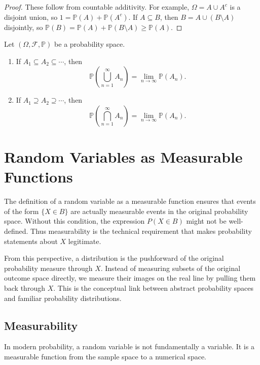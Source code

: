 \begin{proof}
These follow from countable additivity. For example, $\Omega=A\cup A^c$ is a disjoint union, so $1=\mathbb{P}(A)+\mathbb{P}(A^c)$. If $A\subseteq B$, then $B=A\cup(B\setminus A)$ disjointly, so $\mathbb{P}(B)=\mathbb{P}(A)+\mathbb{P}(B\setminus A)\geq\mathbb{P}(A)$.
\end{proof}

\newpage

\begin{proposition}
Let $(\Omega,\mathcal{F},\mathbb{P})$ be a probability space.
\begin{enumerate}
    \item If $A_1\subseteq A_2\subseteq\cdots$, then
    \[
        \mathbb{P}\left(\bigcup_{n=1}^{\infty}A_n\right)=\lim_{n\to\infty}\mathbb{P}(A_n).
    \]
    \item If $A_1\supseteq A_2\supseteq\cdots$, then
    \[
        \mathbb{P}\left(\bigcap_{n=1}^{\infty}A_n\right)=\lim_{n\to\infty}\mathbb{P}(A_n).
    \]
\end{enumerate}
\end{proposition}

\section{Random Variables as Measurable Functions}


The definition of a random variable as a measurable function ensures that events of the form $\{X\in B\}$ are actually measurable events in the original probability space. Without this condition, the expression $P(X\in B)$ might not be well-defined. Thus measurability is the technical requirement that makes probability statements about $X$ legitimate.

From this perspective, a distribution is the pushforward of the original probability measure through $X$. Instead of measuring subsets of the original outcome space directly, we measure their images on the real line by pulling them back through $X$. This is the conceptual link between abstract probability spaces and familiar probability distributions.

\subsection{Measurability}

In modern probability, a random variable is not fundamentally a variable. It is a measurable function from the sample space to a numerical space.

